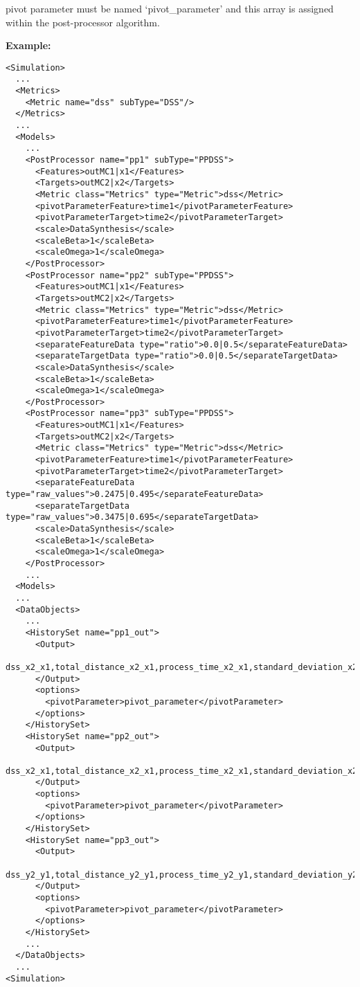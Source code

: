 pivot parameter must be named `pivot\_parameter' and this array is assigned within the post-processor algorithm.

\textbf{Example:}
\begin{lstlisting}[style=XML,morekeywords={subType}]
<Simulation>
  ...
  <Metrics>
    <Metric name="dss" subType="DSS"/>
  </Metrics>
  ...
  <Models>
    ...
    <PostProcessor name="pp1" subType="PPDSS">
      <Features>outMC1|x1</Features>
      <Targets>outMC2|x2</Targets>
      <Metric class="Metrics" type="Metric">dss</Metric>
      <pivotParameterFeature>time1</pivotParameterFeature>
      <pivotParameterTarget>time2</pivotParameterTarget>
      <scale>DataSynthesis</scale>
      <scaleBeta>1</scaleBeta>
      <scaleOmega>1</scaleOmega>
    </PostProcessor>
    <PostProcessor name="pp2" subType="PPDSS">
      <Features>outMC1|x1</Features>
      <Targets>outMC2|x2</Targets>
      <Metric class="Metrics" type="Metric">dss</Metric>
      <pivotParameterFeature>time1</pivotParameterFeature>
      <pivotParameterTarget>time2</pivotParameterTarget>
      <separateFeatureData type="ratio">0.0|0.5</separateFeatureData>
      <separateTargetData type="ratio">0.0|0.5</separateTargetData>
      <scale>DataSynthesis</scale>
      <scaleBeta>1</scaleBeta>
      <scaleOmega>1</scaleOmega>
    </PostProcessor>
    <PostProcessor name="pp3" subType="PPDSS">
      <Features>outMC1|x1</Features>
      <Targets>outMC2|x2</Targets>
      <Metric class="Metrics" type="Metric">dss</Metric>
      <pivotParameterFeature>time1</pivotParameterFeature>
      <pivotParameterTarget>time2</pivotParameterTarget>
      <separateFeatureData type="raw_values">0.2475|0.495</separateFeatureData>
      <separateTargetData type="raw_values">0.3475|0.695</separateTargetData>
      <scale>DataSynthesis</scale>
      <scaleBeta>1</scaleBeta>
      <scaleOmega>1</scaleOmega>
    </PostProcessor>
    ...
  <Models>
  ...
  <DataObjects>
    ...
    <HistorySet name="pp1_out">
      <Output>
          dss_x2_x1,total_distance_x2_x1,process_time_x2_x1,standard_deviation_x2_x1
      </Output>
      <options>
        <pivotParameter>pivot_parameter</pivotParameter>
      </options>
    </HistorySet>
    <HistorySet name="pp2_out">
      <Output>
          dss_x2_x1,total_distance_x2_x1,process_time_x2_x1,standard_deviation_x2_x1
      </Output>
      <options>
        <pivotParameter>pivot_parameter</pivotParameter>
      </options>
    </HistorySet>
    <HistorySet name="pp3_out">
      <Output>
          dss_y2_y1,total_distance_y2_y1,process_time_y2_y1,standard_deviation_y2_y1
      </Output>
      <options>
        <pivotParameter>pivot_parameter</pivotParameter>
      </options>
    </HistorySet>
    ...
  </DataObjects>
  ...
<Simulation>
\end{lstlisting}
